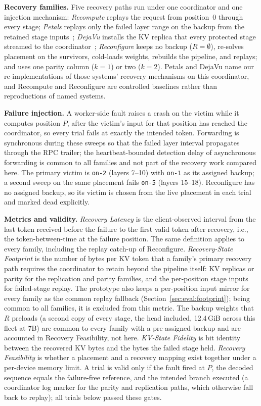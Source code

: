 \textbf{Recovery families.}  Five recovery paths run under one coordinator
and one injection mechanism: \emph{Recompute} replays the request from
position~0 through every stage; \emph{Petals} replays only the failed layer
range on the backup from the retained stage
inputs~\cite{borzunov2023distributed}; \emph{DejaVu} installs the KV replica
that every protected stage streamed to the
coordinator~\cite{strati2024dejavu}; \emph{Reconfigure} keeps no backup
($R=\emptyset$), re-solves placement on the survivors, cold-loads weights,
rebuilds the pipeline, and replays; and \sys{} uses one parity column
($k=1$) or two ($k=2$).
Petals and DejaVu name our re-implementations of those systems' recovery
mechanisms on this coordinator, and Recompute and Reconfigure are controlled
baselines rather than reproductions of named systems.

\textbf{Failure injection.}  A worker-side fault raises a crash on the victim
while it computes position $P$, after the victim's input for that position
has reached the coordinator, so every trial fails at exactly the intended
token.  Forwarding is synchronous during these sweeps so that the failed
layer interval propagates through the RPC trailer; the heartbeat-bounded
detection delay of asynchronous forwarding is common to all families and not
part of the recovery work compared here.  The primary victim is
\texttt{on-2} (layers 7--10) with \texttt{on-1} as its assigned backup; a
second sweep on the same placement fails \texttt{on-5} (layers 15--18).
Reconfigure has no assigned backup, so its victim is chosen from the live
placement in each trial and marked dead explicitly.

\textbf{Metrics and validity.}  \emph{Recovery Latency} is the client-observed
interval from the last token received before the failure to the first valid
token after recovery, i.e., the token-between-time at the failure position.
The same definition applies to every family, including the replay catch-up of
Reconfigure.  \emph{Recovery-State Footprint} is the number of bytes per KV token that a
family's primary recovery path requires the coordinator to retain beyond
the pipeline itself: KV replicas or parity for the replication and parity
families, and the per-position stage inputs for failed-stage replay.  The
prototype also keeps a per-position input mirror for every family as the
common replay fallback (Section~\ref{sec:eval:footprint}); being common to
all families, it is excluded from this metric.  The backup weights that $R$ preloads (a second copy of every stage, the
head included, 12.4\,GiB across this fleet at 7B) are common to every family with a
pre-assigned backup and are accounted in Recovery Feasibility, not here.  \emph{KV-State Fidelity} is
bit identity between the recovered KV bytes and the bytes the failed stage
held.  \emph{Recovery Feasibility} is whether a placement and a recovery
mapping exist together under a per-device memory limit.  A trial is valid
only if the fault fired at $P$, the decoded sequence equals the failure-free
reference, and the intended branch executed (a coordinator log marker for the
parity and replication paths, which otherwise fall back to replay); all
trials below passed these gates.

